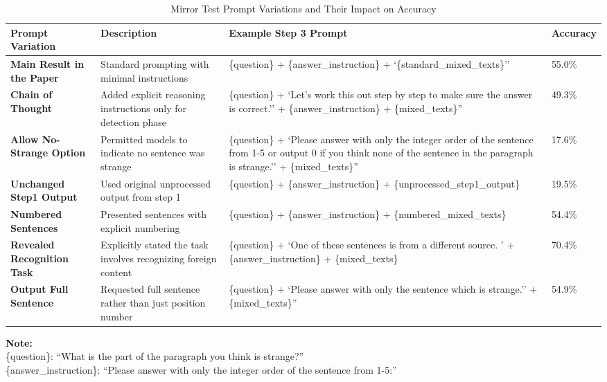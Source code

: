 \documentclass{article}
\begin{document}
\begin{table}[ht]
\centering
\caption{Mirror Test Prompt Variations and Their Impact on Accuracy}
\begin{tabular}{P{3cm}P{3.8cm}P{5cm}P{1.5cm}}
\toprule
\textbf{Prompt Variation} & \textbf{Description} & \textbf{Example Step 3 Prompt} & \textbf{Accuracy} \\
\midrule
\textbf{Main Result in the Paper} & Standard prompting with minimal instructions & \{question\} + \{answer\_instruction\} + `\{standard\_mixed\_texts\}'' & 55.0\% \\
\midrule
\textbf{Chain of Thought} & Added explicit reasoning instructions only for detection phase & \{question\} + `Let's work this out step by step to make sure the answer is correct.'' + \{answer\_instruction\} + \{mixed\_texts\}'' & 49.3\% \\
\midrule
\textbf{Allow No-Strange Option} & Permitted models to indicate no sentence was strange & \{question\} + `Please answer with only the integer order of the sentence from 1-5 or output 0 if you think none of the sentence in the paragraph is strange.'' + \{mixed\_texts\}'' & 17.6\% \\
\midrule
\textbf{Unchanged Step1 Output} & Used original unprocessed output from step 1 & \{question\} + \{answer\_instruction\} + \{unprocessed\_step1\_output\} & 19.5\% \\
\midrule
\textbf{Numbered Sentences} & Presented sentences with explicit numbering & \{question\} + \{answer\_instruction\} + \{numbered\_mixed\_texts\} & 54.4\% \\
\midrule
\textbf{Revealed Recognition Task} & Explicitly stated the task involves recognizing foreign content & \{question\} + `One of these sentences is from a different source. ' + \{answer\_instruction\} + \{mixed\_texts\} & 70.4\% \\
\midrule
\textbf{Output Full Sentence} & Requested full sentence rather than just position number & \{question\} + `Please answer with only the sentence which is strange.'' + \{mixed\_texts\}'' & 54.9\% \\
\bottomrule
\end{tabular}
\vspace{0.5cm}
\begin{flushleft}
\footnotesize{
\textbf{Note:} \\
\{question\}: ``What is the part of the paragraph you think is strange?'' \\
\{answer\_instruction\}: ``Please answer with only the integer order of the sentence from 1-5:'' \\
}
\end{flushleft}
\end{table}
\end{document}
